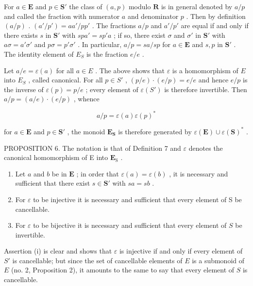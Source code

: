 For \(a \in \mathbf{E}\) and \(p \in \mathbf{S}'\) the class of \((a, p)\) modulo \(\mathbf{R}\) is in general denoted by \(a/p\) and called the fraction with numerator \(a\) and denominator \(p\) . Then by definition \((a/p)\) . \((a'/p') = aa'/pp'\) . The fractions \(a/p\) and \(a'/p'\) are equal if and only if there exists \(s\) in \(\mathbf{S}'\) with \(spa' = sp'a\) ; if so, there exist \(\sigma\) and \(\sigma'\) in \(\mathbf{S}'\) with \(a\sigma = a'\sigma'\) and \(p\sigma = p'\sigma'\) . In particular, \(a/p = sa/sp\) for \(a \in \mathbf{E}\) and \(s, p\) in \(\mathbf{S}'\) . The identity element of \(E_S\) is the fraction \(e/e\) .

Let \(a / e = \varepsilon(a)\) for all \(a \in E\) . The above shows that \(\varepsilon\) is a homomorphism of \(E\) into \(E_S\) , called canonical. For all \(p \in S'\) , \((p / e) \cdot (e / p) = e / e\) and hence \(e / p\) is the inverse of \(\varepsilon(p) = p / e\) ; every element of \(\varepsilon(S')\) is therefore invertible. Then \(a / p = (a / e) \cdot (e / p)\) , whence

\[
a / p = \varepsilon (a) \varepsilon (p) ^ {*}\tag{1}
\]

for \(a \in \mathbf{E}\) and \(p \in \mathbf{S}'\) , the monoid \(\mathbf{E}_{\mathbf{S}}\) is therefore generated by \(\varepsilon(\mathbf{E}) \cup \varepsilon(\mathbf{S})^*\) .

PROPOSITION 6. The notation is that of Definition 7 and \(\varepsilon\) denotes the canonical homomorphism of E into \(\mathbf{E}_{\mathrm{S}}\) .

\begin{enumerate}
\def\labelenumi{(\roman{enumi})}
\item
  Let \(a\) and \(b\) be in \(\mathbf{E}\) ; in order that \(\varepsilon(a) = \varepsilon(b)\) , it is necessary and sufficient that there exist \(s \in \mathbf{S}'\) with \(sa = sb\) .
\item
  For \(\varepsilon\) to be injective it is necessary and sufficient that every element of S be cancellable.
\item
  For \(\varepsilon\) to be bijective it is necessary and sufficient that every element of \(S\) be invertible.
\end{enumerate}

Assertion (i) is clear and shows that \(\varepsilon\) is injective if and only if every element of \(S'\) is cancellable; but since the set of cancellable elements of \(E\) is a submonoid of \(E\) (no. 2, Proposition 2), it amounts to the same to say that every element of \(S\) is cancellable.

